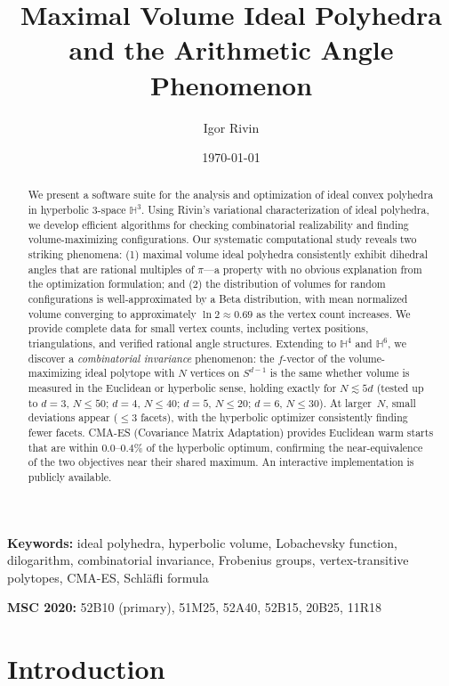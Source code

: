\documentclass[11pt]{article}
\title{Maximal Volume Ideal Polyhedra and the Arithmetic Angle Phenomenon}
\author{Igor Rivin}
\date{\today}
\begin{document}
\maketitle

\begin{abstract}
We present a software suite for the analysis and optimization of ideal convex polyhedra in hyperbolic 3-space $\mathbb{H}^3$. Using Rivin's variational characterization of ideal polyhedra, we develop efficient algorithms for checking combinatorial realizability and finding volume-maximizing configurations. Our systematic computational study reveals two striking phenomena: (1) maximal volume ideal polyhedra consistently exhibit dihedral angles that are rational multiples of $\pi$---a property with no obvious explanation from the optimization formulation; and (2) the distribution of volumes for random configurations is well-approximated by a Beta distribution, with mean normalized volume converging to approximately $\ln 2 \approx 0.69$ as the vertex count increases. We provide complete data for small vertex counts, including vertex positions, triangulations, and verified rational angle structures. Extending to $\mathbb{H}^4$ and $\mathbb{H}^6$, we discover a \emph{combinatorial invariance} phenomenon: the $f$-vector of the volume-maximizing ideal polytope with $N$ vertices on $S^{d-1}$ is the same whether volume is measured in the Euclidean or hyperbolic sense, holding exactly for $N \lesssim 5d$ (tested up to $d=3$, $N \leq 50$; $d=4$, $N \leq 40$; $d=5$, $N \leq 20$; $d = 6$, $N \leq 30$).  At larger~$N$, small deviations appear ($\leq 3$ facets), with the hyperbolic optimizer consistently finding fewer facets.  CMA-ES (Covariance Matrix Adaptation) provides Euclidean warm starts that are within $0.0$--$0.4\%$ of the hyperbolic optimum, confirming the near-equivalence of the two objectives near their shared maximum. An interactive implementation is publicly available.
\end{abstract}

\smallskip\noindent
\textbf{Keywords:} ideal polyhedra, hyperbolic volume, Lobachevsky function,
dilogarithm, combinatorial invariance, Frobenius groups, vertex-transitive
polytopes, CMA-ES, Schl\"afli formula

\smallskip\noindent
\textbf{MSC 2020:} 52B10 (primary), 51M25, 52A40, 52B15, 20B25, 11R18

\tableofcontents

\section{Introduction}
\end{document}
